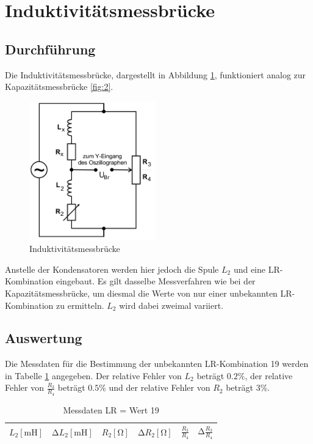 \section{Induktivitätsmessbrücke}
\subsection{Durchführung}
Die Induktivitätsmessbrücke, dargestellt in Abbildung \ref{fig:3}, funktioniert analog zur Kapazitätsmessbrücke \ref{fig:2}.
\begin{figure}[H]
  \centering
  \includegraphics[height=6cm]{indu.png}
  \caption{Induktivitätsmessbrücke \cite{sample}}
  \label{fig:3}
\end{figure}
Anstelle der Kondensatoren werden hier jedoch die Spule $L_2$ und eine LR-Kombination eingebaut.
Es gilt dasselbe Messverfahren wie bei der Kapazitätsmessbrücke, um diesmal die Werte von nur einer unbekannten LR-Kombination zu ermitteln.
$L_2$ wird dabei zweimal variiert.
\subsection{Auswertung}
Die Messdaten für die Bestimmung der unbekannten LR-Kombination 19 werden in Tabelle \ref{tab:6} angegeben.
Der relative Fehler von $L_2$ beträgt $0.2\%$, der relative Fehler von $\frac{R_3}{R_4}$ beträgt $0.5\%$ und der relative Fehler von $R_2$ beträgt $3\%$. \cite{sample}
\begin{table}
  \centering
  \caption{Messdaten LR = Wert 19}
  \label{tab:6}
  \begin{tabular}{c c c c c c}
    \toprule
    {$L_2 [\si{\milli\henry}]$} & {$\increment L_2 [\si{\milli\henry}]$} & {$R_2 [\si{\ohm}]$} & {$\increment R_2 [\si{\ohm}]$} & {$\frac{R_3}{R_4}$} & {$\increment \frac{R_3}{R_4}$} \\
    \midrule
    
    \bottomrule
  \end{tabular}
\end{table}

